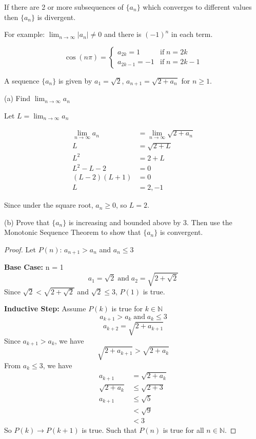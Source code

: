 \begin{theorem}
  If there are 2 or more subsequences of \(\{a_{n}\}\) which converges to different values then \(\{a_{n}\}\) is divergent.
\end{theorem}

For example: $\lim_{n \to \infty} |a_{n}| \neq 0$ and there is $(-1)^{n}$ in each term.

\[
  \cos{(n\pi)} = \begin{cases}
    a_{2k} = 1 & \text{if} \; n = 2k \\
    a_{2k - 1} = -1 & \text{if} \; n = 2k - 1
  \end{cases}
\]

A sequence $\{a_{n}\}$ is given by $a_{1} = \sqrt{2}$, $a_{n + 1} = \sqrt{2 + a_{n}}$ for $n \ge 1$.

(a) Find $\lim_{n \to \infty} a_{n}$

Let $L = \lim_{n \to \infty} a_{n}$

\[
  \nonumber
  \begin{aligned}
    \lim_{n \to \infty} a_{n} &= \lim_{n \to \infty} \sqrt{2 + a_{n}} \\
    L &= \sqrt{2 + L} \\ 
    L^2 &= 2 + L \\
    L^2 - L - 2 &= 0 \\
    (L - 2)(L + 1) &= 0 \\
    L &= 2, -1
  \end{aligned}
\]

Since under the square root, $a_{n} \ge 0$, so $L = 2$.

(b) Prove that $\{a_{n}\}$ is increasing and bounded above by 3. Then use the Monotonic Sequence Theorem to show that $\{a_{n}\}$ is convergent.

\begin{proof}
  Let \(P(n)\): \(a_{n + 1} > a_{n}\) and $a_{n} \le 3$

  \textbf{Base Case: } n = 1
  \[
    a_1 = \sqrt{2} \; \mathrm{and} \; a_2 = \sqrt{2 + \sqrt{2}}
  \]
  Since \(\sqrt{2} < \sqrt{2 + \sqrt{2}}\) and \(\sqrt{2} \le 3\), \(P(1)\) is true.

  \textbf{Inductive Step: } Assume \(P(k)\) is true for \(k \in \mathbb{N}\)
  \[
    a_{k + 1} > a_{k} \; \mathrm{and} \; a_{k} \le 3
  \]
  \[
    a_{k + 2} = \sqrt{2 + a_{k + 1}}
  \]
  Since \(a_{k + 1} > a_{k}\), we have
  \[
    \sqrt{2 + a_{k + 1}} > \sqrt{2 + a_{k}}
  \]
  From $a_{k} \le 3$, we have
  \[
    \begin{aligned}
      a_{k + 1} &= \sqrt{2 + a_{k}} \\
      \sqrt{2 + a_{k}} &\le \sqrt{2 + 3} \\
      a_{k + 1} &\le \sqrt{5} \\
      &< \sqrt{9} \\
      &< 3
    \end{aligned}
  \]
  So \(P(k) \to P(k + 1)\) is true. Such that \(P(n)\) is true for all \(n \in \mathbb{N}\).
\end{proof}